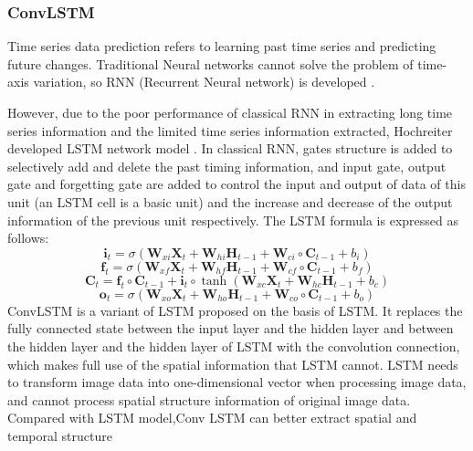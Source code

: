 \documentclass[../main]{subfiles}
\begin{document}
\hypertarget{convlstm}{%
\subsubsection{ConvLSTM}\label{convlstm}}

Time series data prediction refers to learning past time series and
predicting future changes. Traditional Neural networks cannot solve the
problem of time-axis variation, so RNN (Recurrent Neural network) is
developed \cite{JORDAN1997471}.

However, due to the poor performance of classical RNN in extracting long
time series information and the limited time series information
extracted, Hochreiter developed LSTM network model \cite{10.1162/neco.1997.9.8.1735}. In classical RNN, gates structure is added to selectively add
and delete the past timing information, and input gate, output gate and
forgetting gate are added to control the input and output of data of
this unit (an LSTM cell is a basic unit) and the increase and decrease
of the output information of the previous unit respectively. The LSTM
formula is expressed as follows:
\begin{equation}
\mathbf{i}_t=\sigma(\mathbf{W}_{xi}\mathbf{X}_{t}+\mathbf{W}_{hi}\mathbf{H}_{t-1}+\mathbf{W}_{ci}\circ\mathbf{C}_{t-1}+b_i)
\end{equation}
\begin{equation}
\mathbf{f}_t=\sigma(\mathbf{W}_{xf}\mathbf{X}_{t}+\mathbf{W}_{hf}\mathbf{H}_{t-1}+\mathbf{W}_{cf}\circ\mathbf{C}_{t-1}+b_f) 
\end{equation}
\begin{equation}
\mathbf{C}_t=\mathbf{f}_{t}\circ\mathbf{C}_{t-1}+\mathbf{i}_t\circ\tanh(\mathbf{W}_{xc}\mathbf{X}_{t}+\mathbf{W}_{hc}\mathbf{H}_{t-1}+b_c)
\end{equation}
\begin{equation}
\mathbf{o}_t=\sigma(\mathbf{W}_{xo}\mathbf{X}_{t}+\mathbf{W}_{ho}\mathbf{H}_{t-1}+\mathbf{W}_{co}\circ\mathbf{C}_{t-1}+b_o)
\end{equation}
ConvLSTM is a variant of LSTM proposed on the basis of LSTM. It replaces
the fully connected state between the input layer and the hidden layer
and between the hidden layer and the hidden layer of LSTM with the
convolution connection, which makes full use of the spatial information
that LSTM cannot. LSTM needs to transform image data into
one-dimensional vector when processing image data, and cannot process
spatial structure information of original image data. Compared with LSTM
model,Conv LSTM can better extract spatial and temporal structure
\end{document}
